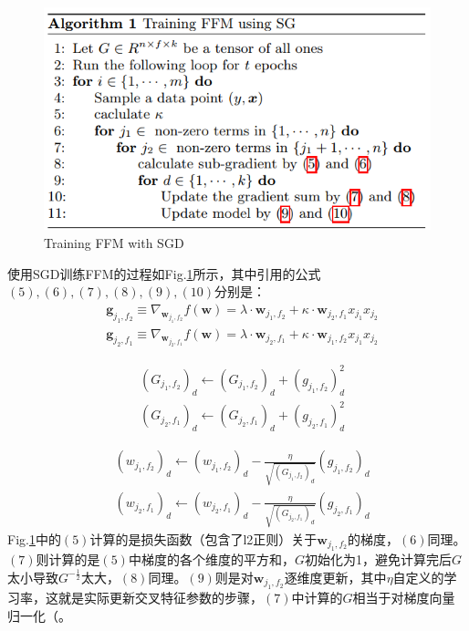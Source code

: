 \begin{figure}[h]
	\centering
	\includegraphics[width=.8\textwidth]{pics/ffm-sg.png}
	\caption{Training FFM with SGD}
	\label{fig:ffm-sg}
\end{figure}
使用SGD训练FFM的过程如Fig.\ref{fig:ffm-sg}所示，其中引用的公式$(5), (6), (7), (8), (9), (10)$分别是：
$$
\begin{aligned}
	&\boldsymbol{g}_{j_{1}, f_{2}} \equiv \nabla_{\boldsymbol{w}_{j_{1}, f_{2}}} f(\boldsymbol{w})=\lambda \cdot \boldsymbol{w}_{j_{1}, f_{2}}+\kappa \cdot \boldsymbol{w}_{j_{2}, f_{1}} x_{j_{1}} x_{j_{2}}\\
	&\boldsymbol{g}_{j_{2}, f_{1}} \equiv \nabla_{\boldsymbol{w}_{j_{2}, f_{1}}} f(\boldsymbol{w})=\lambda \cdot \boldsymbol{w}_{j_{2}, f_{1}}+\kappa \cdot \boldsymbol{w}_{j_{1}, f_{2}} x_{j_{1}} x_{j_{2}}
\end{aligned}
$$

$$
\begin{aligned}
	&\left(G_{j_{1}, f_{2}}\right)_{d} \leftarrow\left(G_{j_{1}, f_{2}}\right)_{d}+\left(g_{j_{1}, f_{2}}\right)_{d}^{2}\\
	&\left(G_{j_{2}, f_{1}}\right)_{d} \leftarrow\left(G_{j_{2}, f_{1}}\right)_{d}+\left(g_{j_{2}, f_{1}}\right)_{d}^{2}
\end{aligned}
$$

$$
\begin{aligned}
	&\left(w_{j_{1}, f_{2}}\right)_{d} \leftarrow\left(w_{j_{1}, f_{2}}\right)_{d}-\frac{\eta}{\sqrt{\left(G_{j_{1}, f_{2}}\right)_{d}}}\left(g_{j_{1}, f_{2}}\right)_{d}\\
	&\left(w_{j_{2}, f_{1}}\right)_{d} \leftarrow\left(w_{j_{2}, f_{1}}\right)_{d}-\frac{\eta}{\sqrt{\left(G_{j_{2}, f_{1}}\right)_{d}}}\left(g_{j_{2}, f_{1}}\right)_{d}
\end{aligned}
$$
Fig.\ref{fig:ffm-sg}中的$(5)$计算的是损失函数（包含了l2正则）关于$\boldsymbol{w}_{j_1, f_2}$的梯度，$(6)$同理。$(7)$则计算的是$(5)$中梯度的各个维度的平方和，$G$初始化为1，避免计算完后$G$太小导致$G^{-\frac{1}{2}}$太大，$(8)$同理。$(9)$则是对$\boldsymbol{w}_{j_1, f_2}$逐维度更新，其中$\eta$自定义的学习率，这就是实际更新交叉特征参数的步骤，$(7)$中计算的$G$相当于对梯度向量归一化（。

